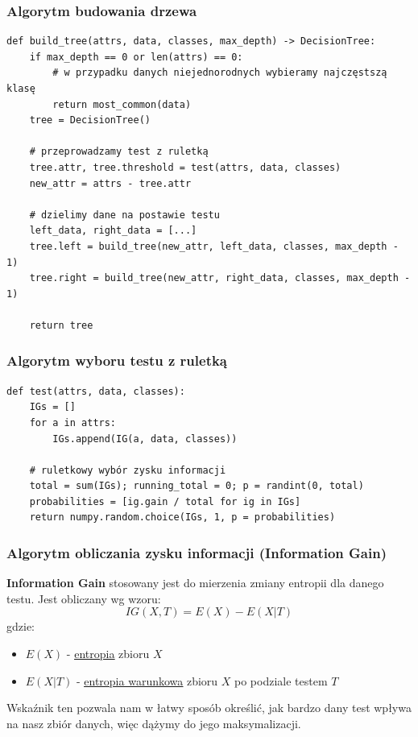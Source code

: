 \documentclass[11pt]{article}
\begin{document}
\subsubsection{Algorytm budowania drzewa}
\label{sec:org8d16fe2}
\begin{verbatim}
def build_tree(attrs, data, classes, max_depth) -> DecisionTree:
    if max_depth == 0 or len(attrs) == 0:
        # w przypadku danych niejednorodnych wybieramy najczęstszą klasę
        return most_common(data)
    tree = DecisionTree()

    # przeprowadzamy test z ruletką
    tree.attr, tree.threshold = test(attrs, data, classes)
    new_attr = attrs - tree.attr

    # dzielimy dane na postawie testu
    left_data, right_data = [...]
    tree.left = build_tree(new_attr, left_data, classes, max_depth - 1)
    tree.right = build_tree(new_attr, right_data, classes, max_depth - 1)

    return tree
\end{verbatim}
\subsubsection{Algorytm wyboru testu z ruletką}
\label{sec:orge6811b9}
\begin{verbatim}
def test(attrs, data, classes):
    IGs = []
    for a in attrs:
        IGs.append(IG(a, data, classes))

    # ruletkowy wybór zysku informacji
    total = sum(IGs); running_total = 0; p = randint(0, total)
    probabilities = [ig.gain / total for ig in IGs]
    return numpy.random.choice(IGs, 1, p = probabilities)
\end{verbatim}
\subsubsection{Algorytm obliczania zysku informacji (Information Gain)}
\label{sec:org5372fdc}
\textbf{Information Gain} stosowany jest do mierzenia zmiany entropii dla danego testu. Jest obliczany wg wzoru:
$$
IG(X,T) = E(X) - E(X|T)
$$
gdzie:
\begin{itemize}
\item $E(X)$ - \hyperref[ent]{\underline{entropia}} zbioru $X$
\item $E(X|T)$ - \hyperref[entwar]{\underline{entropia warunkowa}} zbioru $X$ po podziale testem $T$
\end{itemize}
Wskaźnik ten pozwala nam w łatwy sposób określić, jak bardzo dany test wpływa na nasz zbiór danych, więc dążymy do jego maksymalizacji.
\end{document}
